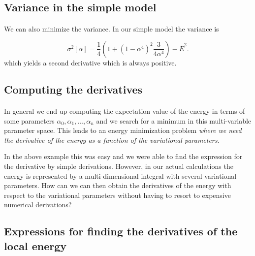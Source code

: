 \documentclass[%
oneside,                 %
final,                   %
10pt]{article}
\begin{document}
\subsection{Variance in the simple model}

\paragraph{}
We can also minimize the variance. In our simple model the variance is

\[
\sigma^2[\alpha]=\frac{1}{4}\left(1+(1-\alpha^4)^2\frac{3}{4\alpha^4}\right)-\overline{E}^2.
\]
which yields a second derivative which is always positive.



\subsection{Computing the derivatives}

\paragraph{}

In general we end up computing the expectation value of the energy in terms 
of some parameters $\alpha_0,\alpha_1,\dots,\alpha_n$
and we search for a minimum in this multi-variable parameter space.  
This leads to an energy minimization problem \emph{where we need the derivative of the energy as a function of the variational parameters}.

In the above example this was easy and we were able to find the expression for the derivative by simple derivations. 
However, in our actual calculations the energy is represented by a multi-dimensional integral with several variational parameters.
How can we can then obtain the derivatives of the energy with respect to the variational parameters without having 
to resort to expensive numerical derivations?



\subsection{Expressions for finding the derivatives of the local energy}

\paragraph{}
\end{document}

